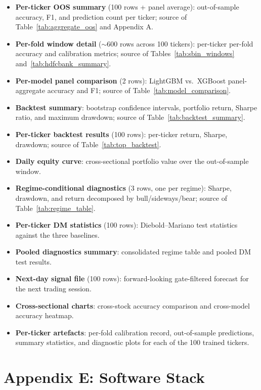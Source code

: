 \begin{itemize}
    \item \textbf{Per-ticker OOS summary} (100 rows + panel average): out-of-sample accuracy, F1, and prediction count per ticker; source of Table~\ref{tab:aggregate_oos} and Appendix A.
    \item \textbf{Per-fold window detail} ($\sim$600 rows across 100 tickers): per-ticker per-fold accuracy and calibration metrics; source of Tables~\ref{tab:sbin_windows} and~\ref{tab:hdfcbank_summary}.
    \item \textbf{Per-model panel comparison} (2 rows): LightGBM vs.\ XGBoost panel-aggregate accuracy and F1; source of Table~\ref{tab:model_comparison}.
    \item \textbf{Backtest summary}: bootstrap confidence intervals, portfolio return, Sharpe ratio, and maximum drawdown; source of Table~\ref{tab:backtest_summary}.
    \item \textbf{Per-ticker backtest results} (100 rows): per-ticker return, Sharpe, drawdown; source of Table~\ref{tab:top_backtest}.
    \item \textbf{Daily equity curve}: cross-sectional portfolio value over the out-of-sample window.
    \item \textbf{Regime-conditional diagnostics} (3 rows, one per regime): Sharpe, drawdown, and return decomposed by bull/sideways/bear; source of Table~\ref{tab:regime_table}.
    \item \textbf{Per-ticker DM statistics} (100 rows): Diebold--Mariano test statistics against the three baselines.
    \item \textbf{Pooled diagnostics summary}: consolidated regime table and pooled DM test results.
    \item \textbf{Next-day signal file} (100 rows): forward-looking gate-filtered forecast for the next trading session.
    \item \textbf{Cross-sectional charts}: cross-stock accuracy comparison and cross-model accuracy heatmap.
    \item \textbf{Per-ticker artefacts}: per-fold calibration record, out-of-sample predictions, summary statistics, and diagnostic plots for each of the 100 trained tickers.
\end{itemize}

\section*{Appendix E: Software Stack}

